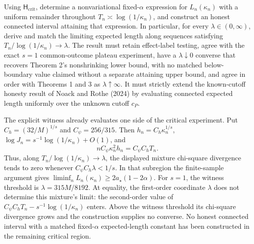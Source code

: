Using \(\mathsf H_{\mathrm{crit}}\), determine a nonvariational
fixed-\(\alpha\) expression for \(L_n(\kappa_n)\) with a uniform
remainder throughout \(T_n\asymp\log(1/\kappa_n)\), and construct an
honest connected interval attaining that expression.  In particular,
for every \(\lambda\in(0,\infty)\), derive and match the limiting
expected length along sequences satisfying
\(T_n/\log(1/\kappa_n)\to\lambda\).  The result must retain
effect-label testing, agree with the exact \(s=1\) common-outcome
plateau experiment, have a \(\lambda\downarrow0\) converse that
recovers Theorem 2's nonshrinking lower bound, with no matched
below-boundary value claimed without a separate attaining upper bound,
and agree in order with Theorems 1 and 3 as
\(\lambda\uparrow\infty\).  It must strictly extend the known-cutoff
honesty result of Noack and Rothe (2024) by evaluating connected
expected length uniformly over the unknown cutoff \(c_P\).

The explicit witness already evaluates one side of the critical
experiment.  Put \(C_h=(32/M)^{1/s}\) and
\(C_\psi=256/315\).  Then
\(h_n=C_h\kappa_n^{1/s}\),
\(\log J_n=s^{-1}\log(1/\kappa_n)+O(1)\), and
\[
 nC_\psi\kappa_n^2h_n=C_\psi C_hT_n.
\]
Thus, along \(T_n/\log(1/\kappa_n)\to\lambda\), the displayed mixture
chi-square divergence tends to zero whenever
\(C_\psi C_h\lambda<1/s\).  In that subregion the finite-sample
argument gives
\(\liminf_nL_n(\kappa_n)\ge2a_\star(1-2\alpha)\).  For \(s=1\), the
witness threshold is \(\lambda=315M/8192\).  At equality, the
first-order coordinate \(\lambda\) does not determine this mixture's
limit: the second-order value of
\(C_\psi C_hT_n-s^{-1}\log(1/\kappa_n)\) enters.  Above the witness
threshold its chi-square divergence grows and the construction
supplies no converse.  No honest connected interval with a matched
fixed-\(\alpha\) expected-length constant has been constructed in the
remaining critical region.
